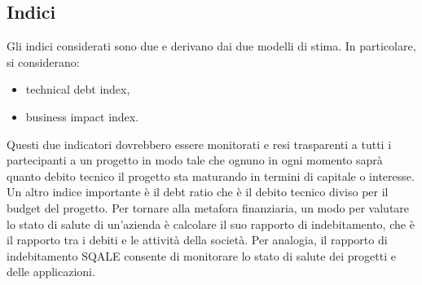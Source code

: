 \subsection{Indici}
Gli indici considerati sono due e derivano dai due modelli di stima. In particolare, si considerano:
\begin{itemize}
	\item technical debt index,
	\item business impact index.
\end{itemize}
Questi due indicatori dovrebbero essere monitorati e resi trasparenti a tutti i partecipanti a un progetto in modo tale che ognuno in ogni momento saprà quanto debito tecnico il progetto sta maturando in termini di capitale o interesse. \\ Un altro indice importante è il debt ratio che è il debito tecnico diviso per il budget del progetto. Per tornare alla metafora finanziaria, un modo per valutare lo stato di salute di un'azienda è calcolare il suo rapporto di indebitamento, che è il rapporto tra i debiti e le attività della società. Per analogia, il rapporto di indebitamento SQALE consente di monitorare lo stato di salute dei progetti e delle applicazioni.
